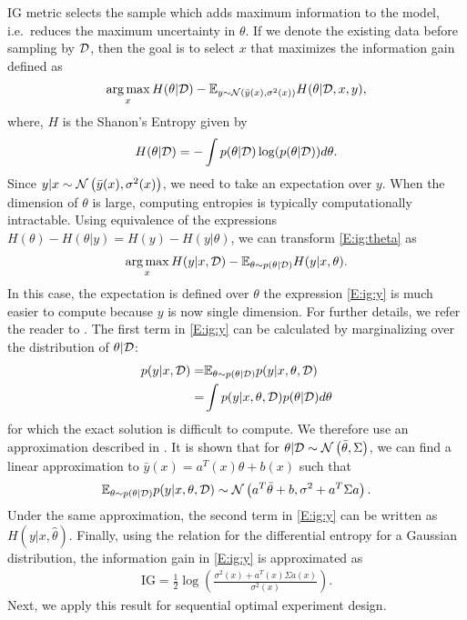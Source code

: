 IG metric selects the sample which adds maximum information to the model, i.e.~reduces the maximum uncertainty in \(\theta\). If we denote the existing data before sampling by \(\mathcal{D}\), then the goal is to select \(x\) that maximizes the information gain defined as
\begin{align}
\argmax_x H(\theta|\D) - \EE_{y \sim \GaussianDist{\bar{y}(x)}{\sigma^2(x)}}H(\theta|\D,x,y),
\label{E:ig:theta}
\end{align}
where, \(H\) is the Shanon's Entropy given by
\begin{align}
H(\theta|\mathcal{D}) = -\int p(\theta|\mathcal{D}) \log (p(\theta|\mathcal{D}))d\theta.
\end{align}
Since \(y|x \sim \operatorname*{\mathcal{N}}\left(\bar{y}(x), \sigma^2(x)\right)\), we need to take an expectation over \(y\). When the dimension of \(\theta\) is large, computing entropies is typically computationally intractable. Using equivalence of the expressions \(H(\theta) - H(\theta|y) = H(y) - H(y|\theta)\),
we can transform \eqref{E:ig:theta} as
\begin{align}
\argmax_x H(y|x,\D) - \EE_{\theta \sim p(\theta|\D)}H(y|x,\theta).
\label{E:ig:y}
\end{align}
In this case, the expectation is defined over \(\theta\) the expression \eqref{E:ig:y} is much easier to compute because \(y\) is now single dimension. For further details, we refer the reader to \cite{Houlsby2011}.
The first term in \eqref{E:ig:y} can be calculated by marginalizing over the distribution of \(\theta|\mathcal{D}\):
\begin{align}
p(y|x,\mathcal{D}) =& \mathbb{E}_{\theta \sim p(\theta|\mathcal{D})}p(y|x,\theta,\mathcal{D}) \nonumber\\
=& \int p(y|x,\theta, \mathcal{D})p(\theta|\mathcal{D})d\theta
\end{align}
for which the exact solution is difficult to compute. We therefore use an approximation described in \cite{Garnett2013}. It is shown that for \(\theta|\mathcal{D} \sim \operatorname*{\mathcal{N}}\left(\bar{\theta}, \Sigma\right)\), we can find a linear approximation to \(\bar{y}(x) = a^T(x)\theta+b(x)\) such that
\begin{align}
\mathbb{E}_{\theta \sim p(\theta|\mathcal{D})}p(y|x,\theta,\mathcal{D}) \sim \operatorname*{\mathcal{N}}\left(a^T\bar{\theta}+b, \sigma^2+a^T\Sigma a\right).
\end{align}
Under the same approximation, the second term in \eqref{E:ig:y} can be written as \(H(y|x,\hat{\theta})\). 
Finally, using the relation for the differential entropy for a Gaussian distribution, the information gain in \eqref{E:ig:y} is approximated as
\begin{align}
\text{IG} = \frac{1}{2}\log\left(\frac{\sigma^2(x)+a^T(x)\Sigma a(x)}{\sigma^2(x)}\right).
\label{E:ig:final}
\end{align}
Next, we apply this result for sequential optimal experiment design.

